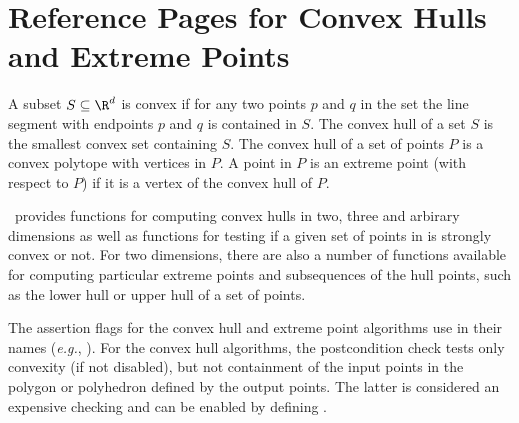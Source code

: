 
\clearpage
\section{Reference Pages for Convex Hulls and Extreme Points}

A subset $S \subseteq \R^d$ is convex if for any two points $p$ and $q$
in the set the line segment with endpoints $p$ and $q$ is contained
in $S$. The convex hull of a set $S$ is 
the smallest convex set containing
$S$. The convex hull of a set of points $P$ is a convex 
polytope with vertices in $P$.  A point in $P$ is an extreme point 
(with respect to $P$) if it is a vertex 
of the convex hull of $P$.

\cgal\ provides functions for computing convex hulls in two, three and
arbirary dimensions as well as functions for testing if a given set of points
in is strongly convex or not.  For two dimensions,
there are also a number of functions available for computing particular
extreme points and subsequences of the hull points, such as the lower
hull or upper hull of a set of points.


The assertion flags for the convex hull and extreme point algorithms
use  in their names (\textit{e.g.}, ).
For the convex hull algorithms, the postcondition
check tests only convexity (if not disabled), but not containment of the
input points in the polygon or polyhedron defined by the output points.
The latter is considered an expensive checking and can be enabled by
defining %
.





